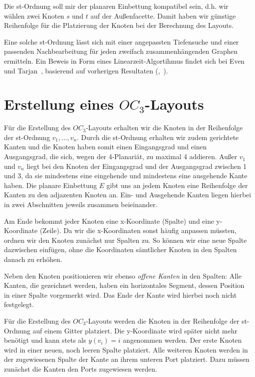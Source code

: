 \documentclass[a4paper]{scrreprt}
\theoremstyle{definition}
\begin{document}
Die st-Ordnung soll mir der planaren Einbettung kompatibel sein, d.h. wir wählen zwei Knoten $s$ und $t$ auf der Außenfacette. Damit haben wir günstige Reihenfolge für die Platzierung der Knoten bei der Berechnung des Layouts. 

Eine solche st-Ordnung lässt sich mit einer angepassten Tiefensuche und einer passenden Nachbearbeitung für jeden zweifach zusammenhängenden Graphen ermitteln. Ein Beweis in Form eines Linearzeit-Algortihmus findet sich bei Even und Tarjan~\cite{even+tarjan-75}, basierend auf vorherigen Resultaten (\cite{hopcroft+tarjan-74},~\cite{tarjan-72}).

\section{Erstellung eines $OC_3$-Layouts}

Für die Erstellung des $OC_3$-Layouts erhalten wir die Knoten in der Reihenfolge der st-Ordnung $v_1, \dots, v_n$. Durch die st-Ordnung erhalten wir zudem gerichtete Kanten und die Knoten haben somit einen Eingangsgrad und einen Ausgangsgrad, die sich, wegen der 4-Planariät, zu maximal 4 addieren. Außer $v_1$ und $v_n$ liegt bei den Knoten der Eingangsgrad und der Ausgangsgrad zwischen 1 und 3, da sie mindestens eine eingehende und mindestens eine ausgehende Kante haben. Die planare Einbettung $E$ gibt uns an jedem Knoten eine Reihenfolge der Kanten zu den adjazenten Knoten an. Ein- und Ausgehende Kanten liegen hierbei in zwei Abschnitten jeweils zusammen beieinander.

Am Ende bekommt jeder Knoten eine x-Koordinate (Spalte) und eine y-Koordinate (Zeile). Da wir die x-Koordinaten sonst häufig anpassen müssten, ordnen wir den Knoten zunächst nur Spalten zu. So können wir eine neue Spalte dazwischen einfügen, ohne die Koordinaten sämtlicher Knoten in den Spalten danach zu erhöhen. 

Neben den Knoten positionieren wir ebenso \emph{offene Kanten} in den Spalten: Alle Kanten, die gezeichnet werden, haben ein horizontales Segment, dessen Position in einer Spalte vorgemerkt wird. Das Ende der Kante wird hierbei noch nicht festgelegt. %

Für die Erstellung des $OC_3$-Layouts werden die Knoten in der Reihenfolge der st-Ordnung auf einem Gitter platziert. Die y-Koordinate wird später nicht mehr benötigt und kann stets als $y(v_i) = i$ angenommen werden. Der erste Knoten wird in einer neuen, noch leeren Spalte platziert. Alle weiteren Knoten werden in der zugewiesenen Spalte der Kante an ihrem unteren Port platziert. Dazu müssen zunächst die Kanten den Ports zugewiesen werden.
\end{document}
